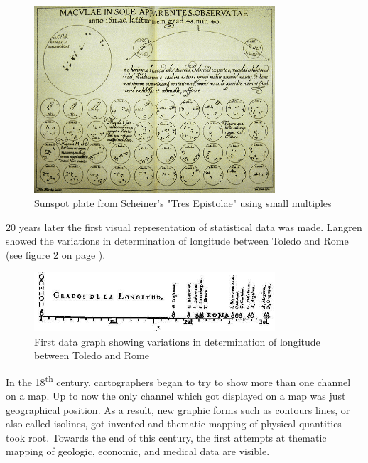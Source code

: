 \begin{figure}[h]
\centering
\includegraphics[width=0.8\textwidth,keepaspectratio]{images/history/small-multiples.png}
\caption[
    Sunspot plate from Scheiner's "Tres Epistolae" using small multiples, Urldate: 07.2016 \newline
\small\texttt{\url{http://cnx.rice.edu/content/m11970/latest/tres_epistolae.gif}}
]{Sunspot plate from Scheiner's "Tres Epistolae" using small multiples}
\label{fig:small-multiples}
\end{figure}

20 years later the first visual representation of statistical data was made. Langren showed the variations in determination of longitude between Toledo and Rome (see figure \ref{fig:langren} on page \pageref{fig:langren}).

\begin{figure}[h]
\centering
\includegraphics[width=0.8\textwidth,keepaspectratio]{images/history/langren.jpg}
\caption[
    First data graph showing variations in determination of longitude between Toledo and Rome, Urldate: 07.2016 \newline
\small\texttt{\url{http://datavis.ca/milestones//admin/uploads/images/tufte/langren.jpg}}
]{First data graph showing variations in determination of longitude between Toledo and Rome}
\label{fig:langren}
\end{figure}

In the 18\textsuperscript{th} century, cartographers began to try to show more than one channel on a map. Up to now the only channel which got displayed on a map was just geographical position. As a result, new graphic forms such as contours lines, or also called isolines, got invented and thematic mapping of physical quantities took root. Towards the end of this century, the first attempts at thematic mapping of geologic, economic, and medical data are visible.

